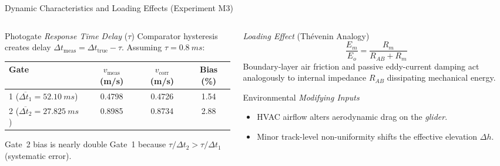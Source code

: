 \documentclass[aspectratio=169,10pt]{beamer}
\newcommand{\sm}{\fontsize{8.2}{10.2}\selectfont}
\newcommand{\xs}{\fontsize{7.1}{9}\selectfont}
\begin{document}
\begin{frame}{Dynamic Characteristics and Loading Effects (Experiment M3)}
\begin{columns}[T,onlytextwidth]
\begin{column}{.50\textwidth}
\begin{block}{Photogate \textit{Response Time Delay} ($\tau$)}\sm
Comparator hysteresis creates delay $\Delta t_{\mathrm{meas}} = \Delta t_{\mathrm{true}} - \tau$. Assuming $\tau = \SI{0.8}{ms}$:
\par\vspace{1.5mm}\centering\xs
\setlength{\tabcolsep}{3.5pt}\begin{tabular}{@{}lccc@{}}
\toprule
\textbf{Gate} & $v_{\mathrm{meas}}$ (m/s) & $v_{\mathrm{corr}}$ (m/s) & \textbf{Bias (\%)}\\
\midrule
1 ($\overline{\Delta t_1} = \SI{52.10}{ms}$) & 0.4798 & 0.4726 & 1.54\\
2 ($\overline{\Delta t_2} = \SI{27.825}{ms}$) & 0.8985 & 0.8734 & 2.88\\
\bottomrule
\end{tabular}
\par\vspace{1.5mm}\raggedright\sm
Gate~2 bias is nearly double Gate~1 because $\tau/\Delta t_2 > \tau/\Delta t_1$ (systematic error).
\end{block}
\end{column}

\begin{column}{.48\textwidth}
\begin{exampleblock}{\textit{Loading Effect} (Th\'evenin Analogy)}\sm
$$\frac{E_m}{E_o} = \frac{R_m}{R_{AB} + R_m}$$
Boundary-layer air friction and passive eddy-current damping act analogously to internal impedance $R_{AB}$ dissipating mechanical energy.
\end{exampleblock}
\begin{alertblock}{Environmental \textit{Modifying Inputs}}\sm
\begin{itemize}
\item HVAC airflow alters aerodynamic drag on the \textit{glider}.
\item Minor track-level non-uniformity shifts the effective elevation $\Delta h$.
\end{itemize}
\end{alertblock}
\end{column}
\end{columns}
\end{frame}
\end{document}
